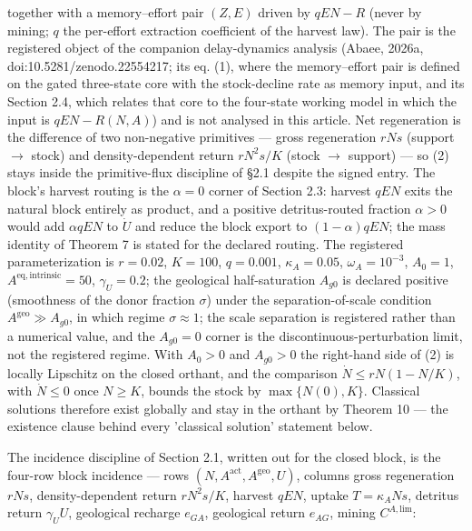 \documentclass[11pt]{article}
\begin{document}
 together with a memory--effort pair \((Z, E)\) driven by \(qEN - R\) (never by mining; \(q\) the per-effort extraction coefficient of the harvest law). The pair is the registered object of the companion delay-dynamics analysis (Abaee, 2026a, doi:10.5281/\allowbreak{}zenodo.22554217; its eq. (1), where the memory--effort pair is defined on the gated three-state core with the stock-decline rate as memory input, and its Section 2.4, which relates that core to the four-state working model in which the input is \(qEN - R(N, A)\)) and is not analysed in this article. Net regeneration is the difference of two non-negative primitives --- gross regeneration \(rNs\) (support \(\to\) stock) and density-dependent return \(rN^2s/\allowbreak{}K\) (stock \(\to\) support) --- so (2) stays inside the primitive-flux discipline of \S2.1 despite the signed entry. The block's harvest routing is the \(\alpha = 0\) corner of Section 2.3: harvest \(qEN\) exits the natural block entirely as product, and a positive detritus-routed fraction \(\alpha > 0\) would add \(\alpha qEN\) to \(\dot U\) and reduce the block export to \((1-\alpha)qEN\); the mass identity of Theorem 7 is stated for the declared routing. The registered parameterization is \(r = 0.02\), \(K = 100\), \(q = 0.001\), \(\kappa_A = 0.05\), \(\omega_A = 10^{-3}\), \(A_0 = 1\), \(A^{\mathrm{eq,\allowbreak{}intrinsic}} =\allowbreak{} 50\), \(\gamma_U = 0.2\); the geological half-saturation \(A_{g0}\) is declared positive (smoothness of the donor fraction \(\sigma\)) under the separation-of-scale condition \(A^{\mathrm{geo}} \gg A_{g0}\), in which regime \(\sigma \approx 1\); the scale separation is registered rather than a numerical value, and the \(A_{g0} = 0\) corner is the discontinuous-perturbation limit, not the registered regime. With \(A_0>0\) and \(A_{g0}>0\) the right-hand side of (2) is locally Lipschitz on the closed orthant, and the comparison \(\dot N\le rN(1-N/\allowbreak{}K)\), with \(\dot N\le0\) once \(N\ge K\), bounds the stock by \(\max\{N(0),K\}\). Classical solutions therefore exist globally and stay in the orthant by Theorem 10 --- the existence clause behind every 'classical solution' statement below.

The incidence discipline of Section 2.1, written out for the closed block, is the four-row block incidence --- rows \((N,\allowbreak{} A^{\mathrm{act}},\allowbreak{} A^{\mathrm{geo}},\allowbreak{} U)\), columns gross regeneration \(rNs\), density-dependent return \(rN^2 s/\allowbreak{}K\), harvest \(qEN\), uptake \(T = \kappa_A N s\), detritus return \(\gamma_U U\), geological recharge \(e_{GA}\), geological return \(e_{AG}\), mining \(C^{A,\mathrm{lim}}\): 
\end{document}
